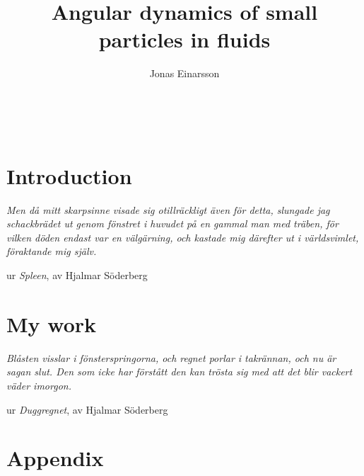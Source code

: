 \documentclass[licentiate,nocover,g5paper,11pt]{gu-thesis}
\title{Angular dynamics of small particles in fluids}
\author{Jonas Einarsson} %
\begin{document}
\pagestyle{empty}
\setcounter{page}{-100} %
~\newpage
\maketitlepage
\clearpage\makeprintinfopage
\cleardoublepage\makeabstractpage
\cleardoublepage\maketableofpaperspage



\cleardoublepage
\setcounter{tocdepth}{1}
\tableofcontents

\cleardoublepage{}
\pagestyle{fancy}
\part{Introduction}
\thispagestyle{fb}

\clearpage\thispagestyle{fb}\cleardoublepage\thispagestyle{fb}
{
\null\vfill
\centering
\parbox{8cm}{%
  \raggedright{\large\itshape%
Men då mitt skarpsinne visade sig otillräckligt även för detta, slungade jag schackbrädet ut genom fönstret i huvudet på en gammal man med träben, för vilken döden endast var en välgärning, och kastade mig därefter ut i världsvimlet, föraktande mig själv.\par\bigskip
  }   
  \raggedleft\large{ur \emph{Spleen}, av Hjalmar Söderberg}\par%
}
\vfill\vfill
}



\newpage\thispagestyle{fb}\cleardoublepage
\part{My work}
\thispagestyle{fb}

\clearpage\thispagestyle{fb}\cleardoublepage
\thispagestyle{fb}
{
\null\vfill
\centering
\parbox{8cm}{%
  \raggedright{\large\itshape%
Blåsten visslar i fönsterspringorna, och regnet porlar i takrännan, och nu är sagan slut. Den som icke har förstått den kan trösta sig med att det blir vackert väder imorgon.\par\bigskip
  }   
  \raggedleft\large{ur \emph{Duggregnet}, av Hjalmar Söderberg}\par%
}
\vfill\vfill
}
\newpage\thispagestyle{fb}\cleardoublepage
\thispagestyle{fb}\makeacknowledgementspage
\clearpage\thispagestyle{fb}\cleardoublepage
\pagestyle{fancy}
\nobibliography*
\clearpage\thispagestyle{fb}\cleardoublepage
\part*{Appendix} %
\appendix
\thispagestyle{fb}

\end{document}
